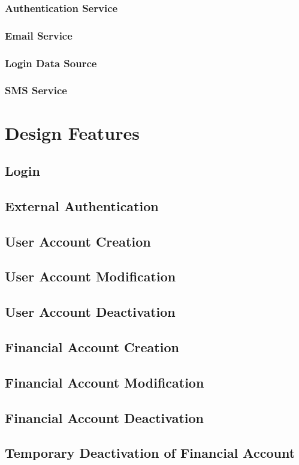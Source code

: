 \documentclass{article}
\begin{document}
\subsubsection{Authentication Service}
\subsubsection{Email Service}
\subsubsection{Login Data Source}
\subsubsection{SMS Service}
\section{Design Features}
\subsection{Login}
\subsection{External Authentication}
\subsection{User Account Creation}
\subsection{User Account Modification}
\subsection{User Account Deactivation}
\subsection{Financial Account Creation}
\subsection{Financial Account Modification}
\subsection{Financial Account Deactivation}
\subsection{Temporary Deactivation of Financial Account}
\end{document}
